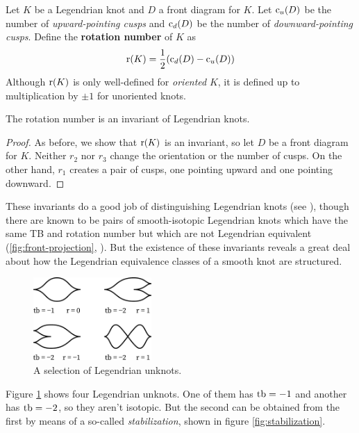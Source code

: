 \begin{definition}
    Let $K$ be a Legendrian knot and $D$ a front diagram for $K$. Let $\operatorname{c}_u(D)$ be the number of \emph{upward-pointing cusps} and $\operatorname{c}_d(D)$ be the number of \emph{downward-pointing cusps}. Define the \textbf{rotation number} of $K$ as 
    \[
        \operatorname{r}(K) = \frac{1}{2} (\operatorname{c}_d(D) - \operatorname{c}_u(D))
    \]
    Although $\operatorname{r}(K)$ is only well-defined for \emph{oriented} $K$, it is defined up to multiplication by $\pm 1$ for unoriented knots.
\end{definition}
\begin{proposition}
    The rotation number is an invariant of Legendrian knots.
\end{proposition}
\begin{proof}
    As before, we show that $\operatorname{r}(K)$ is an invariant, so let $D$ be a front diagram for $K$. Neither $r_2$ nor $r_3$ change the orientation or the number of cusps. On the other hand, $r_1$ creates a pair of cusps, one pointing upward and one pointing downward.
\end{proof}

These invariants do a good job of distinguishing Legendrian knots (see \cite{eliashberg2008unknot}), though there are known to be pairs of smooth-isotopic Legendrian knots which have the same TB and rotation number but which are not Legendrian equivalent (\ref{fig:front-projection}, \cite{chekanov}). But the existence of these invariants reveals a great deal about how the Legendrian equivalence classes of a smooth knot are structured. 

\begin{figure}[ht]
    \centering
    \includegraphics[width=0.4\textwidth]{images/unknots.pdf}
    \caption{A selection of Legendrian unknots.}%
    \label{fig:unknots}
\end{figure}

Figure \ref{fig:unknots} shows four Legendrian unknots. One of them has $\operatorname{tb} = -1$ and another has $\operatorname{tb} = -2$, so they aren't isotopic. But the second can be obtained from the first by means of a so-called \emph{stabilization}, shown in figure \ref{fig:stabilization}. 

